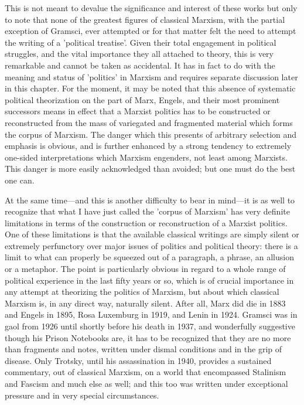 This is not meant to devalue the significance and interest of these works but only to note that none of the greatest figures of classical Marxism, with the partial exception of Gramsci, ever attempted or for that matter felt the need to attempt the writing of a 'political treatise'. Given their total engagement in political struggles, and the vital importance they all attached to theory, this is very remarkable and cannot be taken as accidental. It has in fact to do with the meaning and status of 'politics' in Marxism and requires separate discussion later in this chapter. For the moment, it may be noted that this absence of systematic political theorization on the part of Marx, Engels, and their most prominent successors means in effect that a Marxist politics has to be constructed or reconstructed from the mass of variegated and fragmented material which forms the corpus of Marxism. The danger which this presents of arbitrary selection and emphasis is obvious, and is further enhanced by a strong tendency to extremely one-sided interpretations which Marxism engenders, not least among Marxists. This danger is more easily acknowledged than avoided; but one must do the best one can.

At the same time—and this is another difficulty to bear in mind—it is as well to recognize that what I have just called the 'corpus of Marxism' has very definite limitations in terms of the construction or reconstruction of a Marxist politics. One of these limitations is that the available classical writings are simply silent or extremely perfunctory over major issues of politics and political theory: there is a limit to what can properly be squeezed out of a paragraph, a phrase, an allusion or a metaphor. The point is particularly obvious in regard to a whole range of political experience in the last fifty years or so, which is of crucial importance in any attempt at theorizing the politics of Marxism, but about which classical Marxism is, in any direct way, naturally silent. After all, Marx did die in 1883 and Engels in 1895, Rosa Luxemburg in 1919, and Lenin in 1924. Gramsci was in gaol from 1926 until shortly before his death in 1937, and wonderfully suggestive though his Prison Notebooks are, it has to be recognized that they are no more than fragments and notes, written under dismal conditions and in the grip of disease. Only Trotsky, until his assassination in 1940, provides a sustained commentary, out of classical Marxism, on a world that encompassed Stalinism and Fascism and much else as well; and this too was written under exceptional pressure and in very special circumstances.

